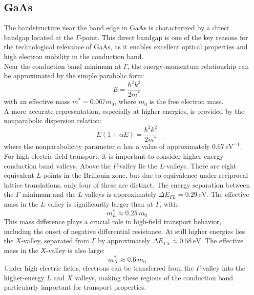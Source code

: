 \subsection{GaAs}
The bandstructure near the band edge in GaAs is characterized by a direct bandgap located at the \( \Gamma \)-point. This direct bandgap is one of the key reasons for the technological relevance of GaAs, as it enables excellent optical properties and high electron mobility in the conduction band.\\
Near the conduction band minimum at \( \Gamma \), the energy-momentum relationship can be approximated by the simple parabolic form:
\begin{equation*}
	E = \frac{\hbar^2 k^2}{2 m^*}
\end{equation*}
\noindent
with an effective mass \( m^* = 0.067 m_0 \), where \( m_0 \) is the free electron mass.\\
A more accurate representation, especially at higher energies, is provided by the nonparabolic dispersion relation:
\begin{equation*}
	E(1 + \alpha E) = \frac{\hbar^2 k^2}{2 m^*}
\end{equation*}
\noindent
where the nonparabolicity parameter \( \alpha \) has a value of approximately \( 0.67\, \text{eV}^{-1} \).\\
For high electric field transport, it is important to consider higher energy conduction band valleys. Above the \( \Gamma \)-valley lie the \( L \)-valleys. There are eight equivalent \( L \)-points in the Brillouin zone, but due to equivalence under reciprocal lattice translations, only four of these are distinct. The energy separation between the \( \Gamma \) minimum and the \( L \)-valleys is approximately \( \Delta E_{\Gamma L} = 0.29\, \text{eV} \). The effective mass in the \( L \)-valley is significantly larger than at \( \Gamma \), with:
\begin{equation}
	m^*_{L} \approx 0.25\, m_0
\end{equation}
This mass difference plays a crucial role in high-field transport behavior, including the onset of negative differential resistance. At still higher energies lies the \( X \)-valley, separated from \( \Gamma \) by approximately \( \Delta E_{\Gamma X} \approx 0.58\, \text{eV} \). The effective mass in the \( X \)-valley is also large:
\begin{equation}
	m^*_{X} \approx 0.6\, m_0
\end{equation}
Under high electric fields, electrons can be transferred from the \( \Gamma \)-valley into the higher-energy \( L \) and \( X \) valleys, making these regions of the conduction band particularly important for transport properties.\\
